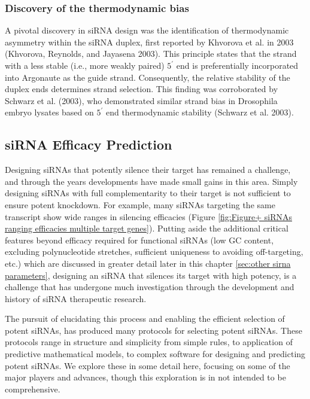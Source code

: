 \documentclass{report}
\begin{document}
\subsubsection{Discovery of the thermodynamic bias}

A pivotal discovery in siRNA design was the identification of thermodynamic asymmetry within the siRNA duplex, first reported by Khvorova et al. in 2003 (Khvorova, Reynolds, and Jayasena 2003). This principle states that the strand with a less stable (i.e., more weakly paired) $5^\prime$ end is preferentially incorporated into Argonaute as the guide strand. Consequently, the relative stability of the duplex ends determines strand selection. This finding was corroborated by Schwarz et al. (2003), who demonstrated similar strand bias in Drosophila embryo lysates based on $5^\prime$ end thermodynamic stability (Schwarz et al. 2003).

\subsection{siRNA Efficacy Prediction}

Designing siRNAs that potently silence their target has remained a challenge, and through the years developments have made small gains in this area. Simply designing siRNAs with full complementarity to their target is not sufficient to ensure potent knockdown. For example, many siRNAs targeting the same transcript show wide ranges in silencing efficacies (Figure \ref{fig:Figure+ siRNAs ranging efficacies multiple target genes}). Putting aside the additional critical features beyond efficacy required for functional siRNAs (low GC content, excluding polynucleotide stretches, sufficient uniqueness to avoiding off-targeting, etc.) which are discussed in greater detail later in this chapter \ref{sec:other sirna parameters}, designing an siRNA that silences its target with high potency, is a challenge that has undergone much investigation through the development and history of siRNA therapeutic research.
 
The pursuit of elucidating this process and enabling the efficient selection of potent siRNAs, has produced many protocols for selecting potent siRNAs. These protocols range in structure and simplicity from simple rules, to application of predictive mathematical models, to complex software for designing and predicting potent siRNAs. We explore these in some detail here, focusing on some of the major players and advances, though this exploration is in not intended to be comprehensive.
\end{document}

